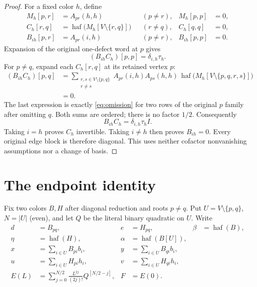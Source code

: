 \documentclass[11pt]{article}
\numberwithin{equation}{section}
\begin{document}
\begin{proof}
For a fixed color \(h\), define
\[
 \begin{aligned}
 M_h[p,r]&=A_{pr}(h,h) &&(p\ne r),& M_h[p,p]&=0,\\
 C_h[r,q]&=\operatorname{haf}\bigl(M_h[V\setminus\{r,q\}]\bigr)
                  &&(r\ne q),& C_h[q,q]&=0,\\
 B_{ih}[p,r]&=A_{pr}(i,h) &&(p\ne r),& B_{ih}[p,p]&=0.
 \end{aligned}
\]
Expansion of the original one-defect word at \(p\) gives
\[
 (B_{ih}C_h)[p,p]=\delta_{i,h}\tau_h.
\]
For \(p\ne q\), expand each \(C_h[r,q]\) at its retained vertex \(p\):
\begin{equation}
 \begin{aligned}
 (B_{ih}C_h)[p,q]
 &=\sum_{\substack{r,s\in V\setminus\{p,q\}\\r\ne s}}
       A_{pr}(i,h)A_{ps}(h,h)\,
       \operatorname{haf}\bigl(M_h[V\setminus\{p,q,r,s\}]\bigr)\\
 &=0.
 \end{aligned}
 \tag{6}\label{eq:cofactor}
\end{equation}
The last expression is exactly \eqref{eq:omission} for two rows of the
original \(p\) family after omitting \(q\). Both sums are ordered; there
is no factor \(1/2\). Consequently
\[
 B_{ih}C_h=\delta_{i,h}\tau_h I.
\]
Taking \(i=h\) proves \(C_h\) invertible. Taking \(i\ne h\) then proves
\(B_{ih}=0\). Every original edge block is therefore diagonal. This uses
neither cofactor nonvanishing assumptions nor a change of basis.
\end{proof}

\section{The endpoint identity}\label{sec:endpoint}

Fix two colors \(B,H\) after diagonal reduction and roots \(p\ne q\).
Put \(U=V\setminus\{p,q\}\), \(N=|U|\) (even), and let \(Q\) be the literal
binary quadratic on \(U\). Write
\[
 \begin{aligned}
 d&=B_{pq},&e&=H_{pq},&\beta&=\operatorname{haf}(B),\\
 \eta&=\operatorname{haf}(H),&\alpha&=\operatorname{haf}(B[U]),\\
 x&=\sum_{i\in U}B_{pi}b_i,& y&=\sum_{i\in U}B_{qi}b_i,\\
 u&=\sum_{i\in U}H_{pi}h_i,& v&=\sum_{i\in U}H_{qi}h_i,\\
 E(L)&=\sum_{j=0}^{N/2}\frac{L^{2j}}{(2j)!}Q^{[N/2-j]},&F&=E(0).
 \end{aligned}
\]
\end{document}
